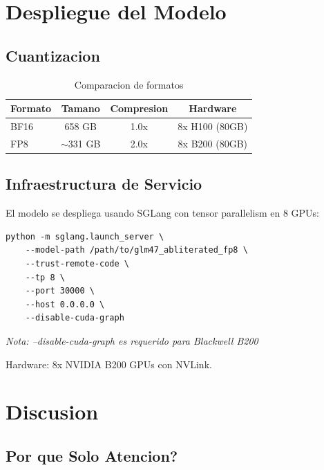 \documentclass[11pt,a4paper]{article}
\begin{document}
\section{Despliegue del Modelo}

\subsection{Cuantizacion}

\begin{table}[H]
\centering
\begin{tabular}{lccc}
\toprule
\textbf{Formato} & \textbf{Tamano} & \textbf{Compresion} & \textbf{Hardware} \\
\midrule
BF16 & 658 GB & 1.0x & 8x H100 (80GB) \\
FP8 & $\sim$331 GB & 2.0x & 8x B200 (80GB) \\
\bottomrule
\end{tabular}
\caption{Comparacion de formatos}
\end{table}

\subsection{Infraestructura de Servicio}

El modelo se despliega usando SGLang con tensor parallelism en 8 GPUs:

\begin{verbatim}
python -m sglang.launch_server \
    --model-path /path/to/glm47_abliterated_fp8 \
    --trust-remote-code \
    --tp 8 \
    --port 30000 \
    --host 0.0.0.0 \
    --disable-cuda-graph
\end{verbatim}

\textit{Nota: --disable-cuda-graph es requerido para Blackwell B200}

Hardware: 8x NVIDIA B200 GPUs con NVLink.

\section{Discusion}

\subsection{Por que Solo Atencion?}
\end{document}
